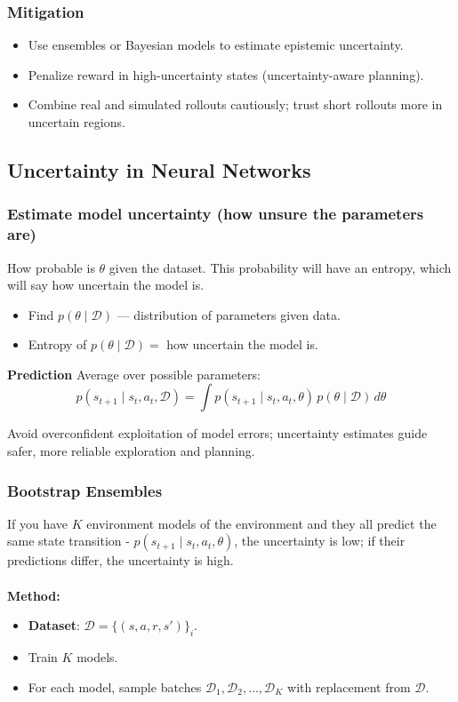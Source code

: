 \documentclass[12pt]{article}
\begin{document}
\subsubsection{Mitigation}
\begin{itemize}
    \item Use ensembles or Bayesian models to estimate epistemic uncertainty.
    \item Penalize reward in high-uncertainty states (uncertainty-aware planning).
    \item Combine real and simulated rollouts cautiously; trust short rollouts more in uncertain regions.
\end{itemize}

\subsection{Uncertainty in Neural Networks}

\subsubsection{Estimate model uncertainty (how unsure the parameters are)}

How probable is $\theta$ given the dataset. This probability will have an entropy, which will say how uncertain the model is. 
\begin{itemize}
    \item Find $p(\theta \mid \mathcal{D})$ — distribution of parameters given data.
    \item Entropy of $p(\theta \mid \mathcal{D}) = $ how uncertain the model is.
\end{itemize}

\textbf{Prediction}
Average over possible parameters:
$$
p(s_{t+1} \mid s_t, a_t, \mathcal{D}) = \int p(s_{t+1} \mid s_t, a_t, \theta) \, p(\theta \mid \mathcal{D}) \, d\theta
$$

Avoid overconfident exploitation of model errors; uncertainty estimates guide safer, more reliable exploration and planning.

\subsubsection{Bootstrap Ensembles}
If you have $K$ environment models of the environment and they all predict the same state transition - $p(s_{t+1} \mid s_t, a_t, \theta)$, the uncertainty is low; if their predictions differ, the uncertainty is high.\\ \\
\textbf{Method:}
\begin{itemize}
    \item \textbf{Dataset}: $\mathcal{D} = \{(s,a,r,s')\}_i$.
    \item Train $K$ models.
    \item For each model, sample batches $\mathcal{D}_1, \mathcal{D}_2, \dots, \mathcal{D}_K$ with replacement from $\mathcal{D}$.
\end{itemize}
\end{document}
